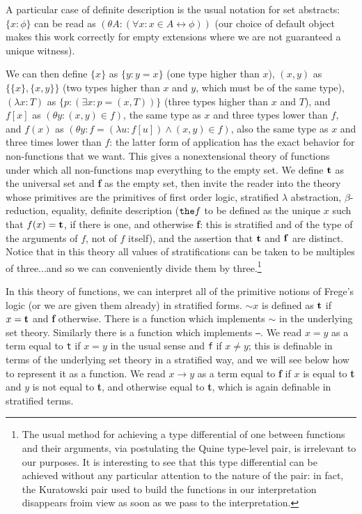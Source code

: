 \documentclass{article}
\begin{document}
{{A particular case of definite description is the usual notation for set abstracts: $\{x:\phi\}$ can be read as $(\theta A:(\forall x:x \in A \leftrightarrow \phi))$  (our choice of default object makes this work correctly for empty extensions where we are not guaranteed a unique witness).

We can then define $\{x\}$ as $\{y :y=x\}$ (one type higher than $x$), $(x,y)$ as $\{\{x\},\{x,y\}\}$ (two types higher than $x$ and $y$, which must be of the same type),
$(\lambda x:T)$ as $\{p:(\exists x:p=(x,T))\}$ (three types higher than $x$ and $T$), and $f[x]$ as $(\theta y:(x,y) \in f)$, the same type as $x$ and three types lower than $f$, and
$f(x)$ as $(\theta y:f = (\lambda u:f[u]) \wedge (x,y) \in f)$, also the same type as $x$ and three times lower than $f$:  the latter form of application has the exact behavior for non-functions that we want.
This gives a nonextensional theory of functions under which all non-functions map everything to the empty set.  We define ${\bf t}$ as the universal set and {\bf f} as the empty set,
then invite the reader into the theory whose primitives are the primitives of first order logic, stratified $\lambda$ abstraction, $\beta$-reduction, equality, definite description (${\tt the} f$ to be defined as the unique $x$ such that $f(x)={\bf t}$, if there is one, and otherwise {\bf f}:  this is stratified and of the type of the arguments of $f$, not of $f$ itself), and the assertion that ${\bf t}$ and ${\bf f}$ are distinct.
Notice that in this theory all values of stratifications can be taken to be multiples of three...and so we can conveniently divide them by three.\footnote{The usual method for achieving a type differential of one between functions and their arguments, via postulating the Quine type-level pair, is irrelevant to our purposes.  It is interesting to see that this type differential can be achieved without any particular attention to the nature of the pair:  in fact, the Kuratowski pair used to build the functions in our interpretation disappears froim view as soon as we pass to the interpretation.}  

In this theory of functions, we can interpret all of the primitive notions of Frege's logic (or we are given them already) in stratified forms.   $\sim x$ is defined as ${\bf t}$ if
$x={\bf t}$ and {\bf f} otherwise.  There is a function which implements $\sim$ in the underlying set theory.  Similarly there is a function which implements {\tt --}.
We read $x=y$ as a term equal to {\tt t} if $x=y$ in the usual sense and {\tt f} if $x \neq y$;  this is definable in terms of the underlying set theory in a stratified way,
and we will see below how to represent it as a function.  We read $x \rightarrow y$ as a term equal to {\bf f} if $x$ is equal to {\bf t} and $y$ is not equal to {\bf t}, and otherwise equal to {\bf t}, which is again definable in stratified terms.

}}
\end{document}
